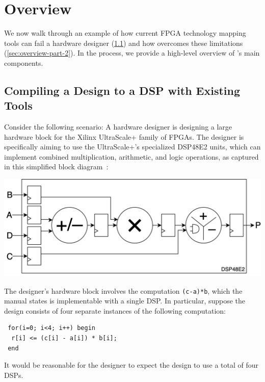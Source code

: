 \section{Overview}
\label{sec:overview}

We now walk through an 
  example
  of how current FPGA technology mapping tools can fail
  a hardware designer (\cref{sec:overview-part-1}) 
  and how \lr overcomes these limitations (\cref{sec:overview-part-2}).
In the process,
  we provide a high-level overview
  of \lr's main components.

\subsection{Compiling a Design to a DSP with Existing Tools}
\label{sec:overview-part-1}

Consider the following scenario:
A hardware designer
  is designing a large hardware block
  for the Xilinx UltraScale+ family of FPGAs.
The designer is specifically aiming to use 
  the UltraScale+'s specialized DSP48E2 units,
  which 
  can implement 
  combined multiplication, arithmetic,
  and logic operations, as 
  captured in this 
  simplified
  block diagram~\cite{userguide}:
\begin{center}
\includegraphics[width=.75\columnwidth]{lakeroad/assets/dsp48e2-block-diagram-simplified.drawio.png}
\end{center}
The designer's hardware block
  involves the computation
  \texttt{(c-a)*b},
  which the manual states is implementable with a single DSP.
In particular, suppose the design
  consists of four separate instances of the following computation:
\begin{center}
\begin{verbatim}
 for(i=0; i<4; i++) begin
  r[i] <= (c[i] - a[i]) * b[i];
 end
\end{verbatim}
\end{center}
It would be reasonable for the designer
  to expect the design
  to use a total of four DSPs.

